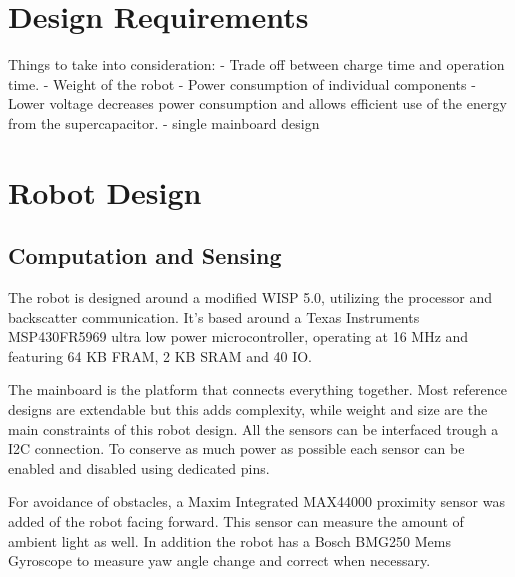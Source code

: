 \documentclass[letterpaper, 10 pt, conference]{ieeeconf}  %
\begin{document}
\section{Design Requirements}

Things to take into consideration:
- Trade off between charge time and operation time.
- Weight of the robot
- Power consumption of individual components
- Lower voltage decreases power consumption and allows efficient use of the energy from the supercapacitor.
- single mainboard design







\section{Robot Design}


\subsection{Computation and Sensing}

The robot is designed around a modified WISP 5.0, utilizing the processor and backscatter communication.
It's based around a Texas Instruments MSP430FR5969 ultra low power microcontroller, operating at 16 MHz and featuring 64 KB FRAM, 2 KB SRAM and 40 IO. 


The mainboard is the platform that connects everything together.
Most reference designs are extendable but this adds complexity, while weight and size are the main constraints of this robot design.
All the sensors can be interfaced trough a I2C connection.
To conserve as much power as possible each sensor can be enabled and disabled using dedicated pins.

For avoidance of obstacles, a Maxim Integrated MAX44000 proximity sensor was added of the robot facing forward.
This sensor can measure the amount of ambient light as well.
In addition the robot has a Bosch BMG250 Mems Gyroscope to measure yaw angle change and correct when necessary.
\end{document}
